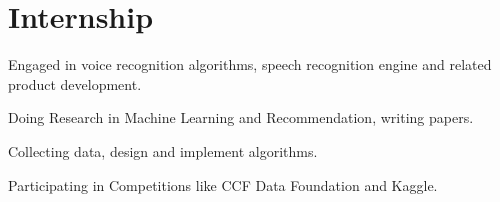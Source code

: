 \documentclass[letterpaper]{deedy-resume} %
\begin{document}
\hfill
%
%
\begin{minipage}[t]{0.69\textwidth} %



\section{Internship}

\vspace{\topsep} %
\begin{tightitemize}
\item Engaged in voice recognition algorithms, speech recognition engine and related product development. 
\end{tightitemize}

\sectionspace %


\begin{tightitemize}
\item Doing Research in Machine Learning and Recommendation, writing papers.
\item Collecting data, design and implement algorithms.
\item Participating in Competitions like CCF Data Foundation and Kaggle.
\end{tightitemize}




\end{minipage}
\end{document}
